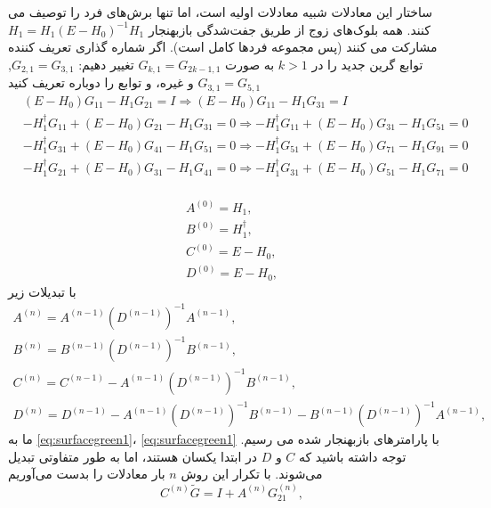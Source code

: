 ساختار این معادلات شبیه معادلات اولیه است، اما تنها برش‌های فرد را توصیف می کنند. همه بلوک‌های زوج از طریق جفت‌شدگی بازبهنجار $H_1 = H_1 (E - H_0)^{-1}H_{1}$ مشارکت می کنند (پس مجموعه فردها کامل است). اگر شماره گذاری تعریف کننده توابع گرین جدید را در $k > 1$ به صورت $G_{k,1}= G_{2k-1,1}$ تغییر دهیم: $G_{2,1} = G_{3,1}$, $G_{3,1} = G_{5,1}$ و غیره، و توابع را دوباره تعریف کنید
\begin{equation}
    \begin{aligned}
        & \left( E-{{H}_{0}} \right){{G}_{11}}-{{H}_{1}}{{G}_{21}}=I\Rightarrow \left( E-{{H}_{0}} \right){{G}_{11}}-{{H}_{1}}{{G}_{31}}=I \\ 
       & -H_{1}^{\dagger }{{G}_{11}}+\left( E-{{H}_{0}} \right){{G}_{21}}-{{H}_{1}}{{G}_{31}}=0\Rightarrow -H_{1}^{\dagger }{{G}_{11}}+\left( E-{{H}_{0}} \right){{G}_{31}}-{{H}_{1}}{{G}_{51}}=0 \\ 
       & -H_{1}^{\dagger }{{G}_{31}}+\left( E-{{H}_{0}} \right){{G}_{41}}-{{H}_{1}}{{G}_{51}}=0\Rightarrow -H_{1}^{\dagger }{{G}_{51}}+\left( E-{{H}_{0}} \right){{G}_{71}}-{{H}_{1}}{{G}_{91}}=0 \\ 
       & -H_{1}^{\dagger }{{G}_{21}}+\left( E-{{H}_{0}} \right){{G}_{31}}-{{H}_{1}}{{G}_{41}}=0\Rightarrow -H_{1}^{\dagger }{{G}_{31}}+\left( E-{{H}_{0}} \right){{G}_{51}}-{{H}_{1}}{{G}_{71}}=0 \\ 
      \end{aligned}
\end{equation}

\begin{equation}
    \begin{aligned}
        {{A}^{(0)}}={{H}_{1}},\\
        {{B}^{(0)}}=H_{1}^{\dagger},\\
        {{C}^{(0)}}=E-{{H}_{0}},\\
        {{D}^{(0)}}=E-{{H}_{0}},
    \end{aligned}
\end{equation}
با تبدیلات زیر
\begin{equation}
    \begin{aligned}
        {{A}^{(n)}}={{A}^{(n-1)}}{{({{D}^{(n-1)}})}^{-1}}{{A}^{(n-1)}},\\
        {{B}^{(n)}}={{B}^{(n-1)}}{{({{D}^{(n-1)}})}^{-1}}{{B}^{(n-1)}},\\
        {{C}^{(n)}}={{C}^{(n-1)}}-{{A}^{(n-1)}}{{({{D}^{(n-1)}})}^{-1}}{{B}^{(n-1)}},\\
        {{D}^{(n)}}={{D}^{(n-1)}}-{{A}^{(n-1)}}{{({{D}^{(n-1)}})}^{-1}}{{B}^{(n-1)}}-{{B}^{(n-1)}}{{({{D}^{(n-1)}})}^{-1}}{{A}^{(n-1)}},
    \end{aligned}
\end{equation}
ما به \ref{eq:surfacegreen1}، \ref{eq:surfacegreen1} با پارامترهای بازبهنجار شده می رسیم. توجه داشته باشید که $C$ و $D$ در ابتدا یکسان هستند، اما به طور متفاوتی تبدیل می‌شوند. با تکرار این روش $n$ بار معادلات را بدست می‌آوریم
\begin{equation}
    {{C}^{(n)}}\tilde{G}=I+{{A}^{(n)}}G_{21}^{(n)},
\end{equation}

